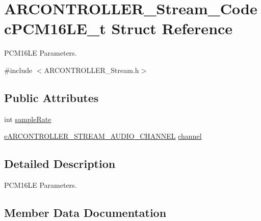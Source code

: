 \hypertarget{struct_a_r_c_o_n_t_r_o_l_l_e_r___stream___codec_p_c_m16_l_e__t}{}\section{A\+R\+C\+O\+N\+T\+R\+O\+L\+L\+E\+R\+\_\+\+Stream\+\_\+\+Codec\+P\+C\+M16\+L\+E\+\_\+t Struct Reference}
\label{struct_a_r_c_o_n_t_r_o_l_l_e_r___stream___codec_p_c_m16_l_e__t}


P\+C\+M16\+LE Parameters.  




{\ttfamily \#include $<$A\+R\+C\+O\+N\+T\+R\+O\+L\+L\+E\+R\+\_\+\+Stream.\+h$>$}

\subsection*{Public Attributes}
\begin{DoxyCompactItemize}
\item 
int \hyperlink{struct_a_r_c_o_n_t_r_o_l_l_e_r___stream___codec_p_c_m16_l_e__t_ac3bafab7a9a5f04c5f76d3bde59ce40a}{sample\+Rate}
\item 
\hyperlink{_a_r_c_o_n_t_r_o_l_l_e_r___stream_8h_a02e53c8e1db346144875ef03785380c0}{e\+A\+R\+C\+O\+N\+T\+R\+O\+L\+L\+E\+R\+\_\+\+S\+T\+R\+E\+A\+M\+\_\+\+A\+U\+D\+I\+O\+\_\+\+C\+H\+A\+N\+N\+EL} \hyperlink{struct_a_r_c_o_n_t_r_o_l_l_e_r___stream___codec_p_c_m16_l_e__t_a88d62a1b91a2856c2762511e43924035}{channel}
\end{DoxyCompactItemize}


\subsection{Detailed Description}
P\+C\+M16\+LE Parameters. 

\subsection{Member Data Documentation}
